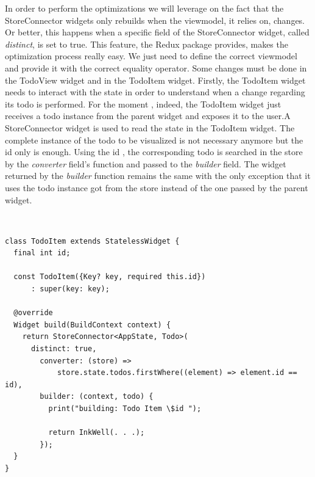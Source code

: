 In order to perform the optimizations we will leverage on the fact that the StoreConnector widgets only rebuilds when the viewmodel, it relies on, changes. Or better, this happens when a specific field of the StoreConnector widget, called \textit{distinct}, is set to true. This feature, the Redux package provides, makes the optimization process really easy. We just need to define the correct viewmodel and provide it with the correct equality operator. Some changes must be done in the TodoView widget and in the TodoItem widget. Firstly, the TodoItem widget needs to interact with the state in order to understand when a change regarding its todo is performed. For the moment , indeed, the TodoItem widget just receives a todo instance from the parent widget and exposes it to the user.A StoreConnector widget is used to read the state in the TodoItem widget. The complete instance of the todo to be visualized is not necessary anymore but the id only is enough. Using the id , the corresponding todo is searched in the store by the \textit{converter} field’s function and passed to the \textit{builder} field. The widget returned by the \textit{builder} function remains the same with the only exception that it uses the todo instance got from the store instead of the one passed by the parent widget. 
\begin{code}
\mbox{}\\
 \mbox{}
		\label{code:2.14}
\begin{verbatim}
class TodoItem extends StatelessWidget {
  final int id;

  const TodoItem({Key? key, required this.id})
      : super(key: key);

  @override
  Widget build(BuildContext context) {
    return StoreConnector<AppState, Todo>(
      distinct: true,
        converter: (store) =>
            store.state.todos.firstWhere((element) => element.id == id),
        builder: (context, todo) {
          print("building: Todo Item \$id ");

          return InkWell(. . .);
        });
  }
}
\end{verbatim}
\mbox{}
\end{code}

